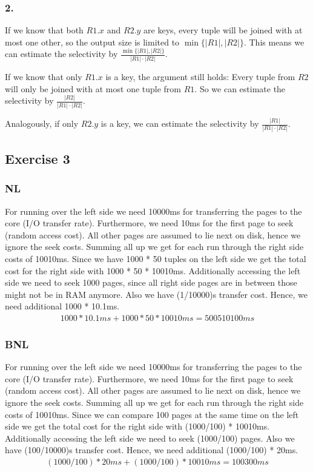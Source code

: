 \documentclass{scrartcl}
\begin{document}
\subsubsection*{2.}

If we know that both $R1.x$ and $R2.y$ are keys, every tuple will be joined with
at most one other, so the output size is limited to $\min\{|R1|, |R2|\}$. This
means we can estimate the selectivity by $\frac{\min\{|R1|, |R2|\}}{|R1| \cdot
|R2|}$.

If we know that only $R1.x$ is a key, the argument still holds: Every tuple from
$R2$ will only be joined with at most one tuple from $R1$. So we can estimate
the selectivity by $\frac{|R2|}{|R1| \cdot |R2|}$.

Analogously, if only $R2.y$ is a key, we can estimate the selectivity by
$\frac{|R1|}{|R1| \cdot |R2|}$.


\subsection*{Exercise 3}
\subsubsection*{NL}
For running over the left side we need 10000ms for transferring the pages to the core (I/O transfer rate). Furthermore,
we need 10ms for the first page to seek (random access cost). All other pages are assumed to lie next on disk, hence we
ignore the seek costs. Summing all up we get for each run through the right side costs of 10010ms.
Since we have 1000 * 50 tuples on the left side we get the total cost for the right side with 1000 * 50 * 10010ms.
Additionally accessing the left side we need to seek 1000 pages, since all right side pages are in between those might
not be in RAM anymore. Also we have (1/10000)s transfer cost. Hence, we need additional 1000 * 10.1ms.
\begin{align}
1000 * 10.1 ms + 1000 * 50 * 10010ms = 500510100 ms
\end{align}


\subsubsection*{BNL}
For running over the left side we need 10000ms for transferring the pages to the core (I/O transfer rate). Furthermore,
we need 10ms for the first page to seek (random access cost). All other pages are assumed to lie next on disk, hence we
ignore the seek costs. Summing all up we get for each run through the right side costs of 10010ms.
Since we can compare 100 pages at the same time on the left side we get the total cost for the right side with
(1000/100) * 10010ms. Additionally accessing the left side we need to seek (1000/100) pages. Also we have (100/10000)s
transfer cost. Hence, we need additional (1000/100) * 20ms.
\begin{align}
(1000/100) * 20 ms + (1000/100) * 10010ms = 100300 ms
\end{align}
\end{document}

